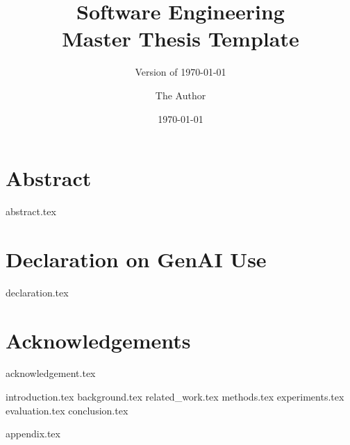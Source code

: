 \documentclass{mscthesis}
\title{Software Engineering\\Master Thesis Template}
\subtitle{Version of \today} %
\date{\today}
\author{The Author}
\begin{document}
%
%

\frontmatter
\makecoverpage

\cleartorecto{}
\makeformaltitlepages

\cleartorecto{}

\cleartorecto{}
\chapter{Abstract}
{abstract.tex}
\glsresetall{}

\cleartorecto{}
\chapter{Declaration on GenAI Use}
{declaration.tex}
\clearpage{}

\cleartorecto{}
\tableofcontents{}
\clearpage{}

\listoffigures{}
\clearpage{}

\listoftables{}
\clearpage{}

\cleartorecto{}
\chapter{Acknowledgements}
{acknowledgement.tex}


\mainmatter

{introduction.tex}
{background.tex}
{related_work.tex}
{methods.tex}
{experiments.tex}
{evaluation.tex}
{conclusion.tex}

%
%

\appendix

{appendix.tex}

%
%

\backmatter

\printbibliography{}
\cleardoublepage{}

\printacronyms[style=long,title={Acronyms}]
\cleardoublepage{}

\end{document}
